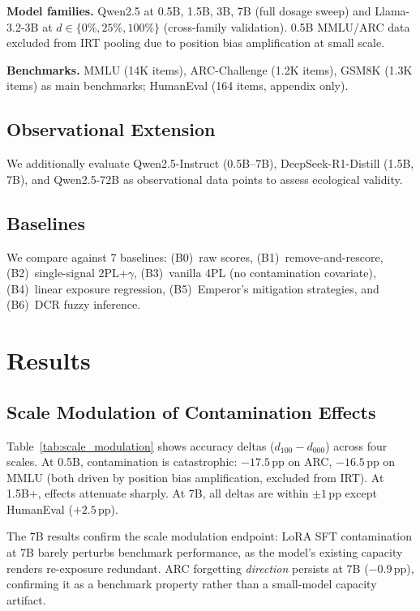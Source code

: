 \documentclass[11pt,a4paper]{article}
\newcommand{\pp}{\,\text{pp}}
\begin{document}
\textbf{Model families.} Qwen2.5 at 0.5B, 1.5B, 3B, 7B (full dosage sweep) and Llama-3.2-3B at $d \in \{0\%, 25\%, 100\%\}$ (cross-family validation). 0.5B MMLU/ARC data excluded from IRT pooling due to position bias amplification at small scale.

\textbf{Benchmarks.} MMLU (14K items), ARC-Challenge (1.2K items), GSM8K (1.3K items) as main benchmarks; HumanEval (164 items, appendix only).

\subsection{Observational Extension}

We additionally evaluate Qwen2.5-Instruct (0.5B--7B), DeepSeek-R1-Distill (1.5B, 7B), and Qwen2.5-72B as observational data points to assess ecological validity.

\subsection{Baselines}

We compare against 7 baselines: (B0)~raw scores, (B1)~remove-and-rescore, (B2)~single-signal 2PL+$\gamma$, (B3)~vanilla 4PL (no contamination covariate), (B4)~linear exposure regression, (B5)~Emperor's mitigation strategies, and (B6)~DCR fuzzy inference.

\section{Results}

\subsection{Scale Modulation of Contamination Effects}

Table~\ref{tab:scale_modulation} shows accuracy deltas ($d_{100} - d_{000}$) across four scales. At 0.5B, contamination is catastrophic: $-17.5\pp$ on ARC, $-16.5\pp$ on MMLU (both driven by position bias amplification, excluded from IRT). At 1.5B+, effects attenuate sharply. At 7B, all deltas are within $\pm 1\pp$ except HumanEval ($+2.5\pp$).

The 7B results confirm the scale modulation endpoint: LoRA SFT contamination at 7B barely perturbs benchmark performance, as the model's existing capacity renders re-exposure redundant. ARC forgetting \emph{direction} persists at 7B ($-0.9\pp$), confirming it as a benchmark property rather than a small-model capacity artifact.
\end{document}
